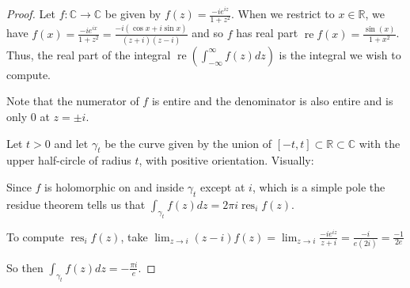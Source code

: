 \documentclass{article}
\DeclareMathOperator{\re}{re}
\DeclareMathOperator{\res}{res}
\begin{document}
\begin{enumerate}
	\begin{proof}
		Let $f: \mathbb{C} \rightarrow \mathbb{C}$ be given by $f(z) = \frac{-i e^{iz}}{1+z^2}.$ 
		When we restrict to $x \in \mathbb{R}$, we have 
		$f(x) = \frac{-ie^{ix}}{1+z^2} = \frac{-i(\cos x + i \sin x)}{(z+i)(z-i)}$ and so $f$ has real part $\re f(x) = \frac{\sin(x)}{1+x^2}$.
		Thus, the real part of the integral $\re \left (\int_{-\infty}^{\infty} f(z) dz \right)$ is the integral we wish to compute.
		
		Note that the numerator of $f$ is entire and the denominator is also entire and is only $0$ at $z = \pm i$.
		
		Let $t>0$ and let $\gamma_t$ be the curve given by the union of $[-t,t] \subset \mathbb{R}\subset \mathbb{C}$ with the upper half-circle of radius $t$, with positive orientation. 
		Visually:
		\begin{center}
		\end{center}
		
		Since $f$ is holomorphic on and inside $\gamma_t$ except at $i$, which is a simple pole
		the residue theorem tells us that 
		$\int_{\gamma_t} f(z) dz = 2\pi i \res_{i} f(z)$.
		
		To compute $\res_i f(z)$, take $\lim_{z \rightarrow i} (z-i) f(z) = \lim_{z \rightarrow i} \frac{-ie^{iz}}{z+i} = \frac{-i}{e (2i)} =\frac{-1}{2e}$
		
		So then $\int_{\gamma_t} f(z)dz = -\frac{\pi i}{e}$.
		

\end{proof}
\end{enumerate}
\end{document}
